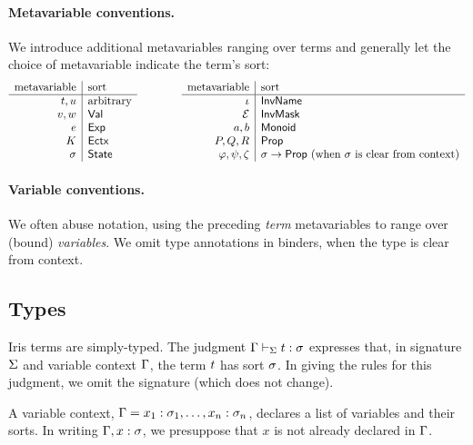 \paragraph{Metavariable conventions.}
We introduce additional metavariables ranging over terms and generally let the choice of metavariable indicate the term's sort:
\[
\begin{array}{r|l}
 \text{metavariable} & \text{sort} \\\hline
  t, u & \text{arbitrary} \\
  v, w & \textsf{Val} \\
  e & \textsf{Exp} \\
  K & \textsf{Ectx} \\
  \sigma & \textsf{State} \\
\end{array}
\qquad\qquad
\begin{array}{r|l}
 \text{metavariable} & \text{sort} \\\hline
  \iota & \textsf{InvName} \\
  \mathcal{E} & \textsf{InvMask} \\
  a, b & \textsf{Monoid} \\
  P, Q, R & \textsf{Prop} \\
  \varphi, \psi, \zeta & \sigma\to\textsf{Prop} \text{ (when $\sigma$ is clear from context)} \\
\end{array}
\]

\paragraph{Variable conventions.}
We often abuse notation, using the preceding \emph{term} metavariables to range over (bound) \emph{variables}.
We omit type annotations in binders, when the type is clear from context.


\subsection{Types}\label{sec:types}

Iris terms are simply-typed.
The judgment $\Gamma \vdash_\Sigma t : \sigma$ expresses that, in signature $\Sigma$ and variable context $\Gamma$, the term $t$ has sort $\sigma$.
In giving the rules for this judgment, we omit the signature (which does not change).

A variable context, $\Gamma = x_1:\sigma_1, \dots, x_n:\sigma_n$, declares a list of variables and their sorts.
In writing $\Gamma, x:\sigma$, we presuppose that $x$ is not already declared in $\Gamma$.

